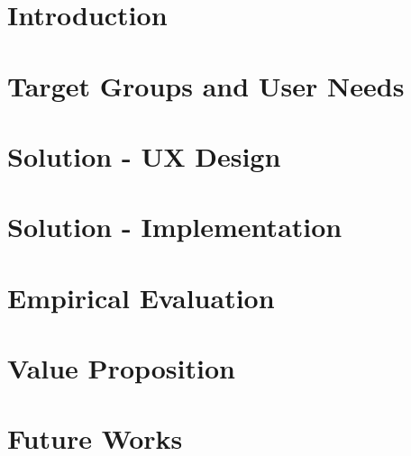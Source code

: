 \documentclass[a4paper,12pt]{report}
\begin{document}
\setcounter{tocdepth}{1}
\tableofcontents

\chapter{Introduction}

\clearpage

\chapter{Target Groups and User Needs}
%
\clearpage

\chapter{Solution - UX Design}
%
\clearpage

\chapter{Solution - Implementation}
%
\clearpage

\chapter{Empirical Evaluation}
%
\clearpage

\chapter{Value Proposition}
%
\clearpage

\chapter{Future Works}
%
\clearpage
\end{document}
